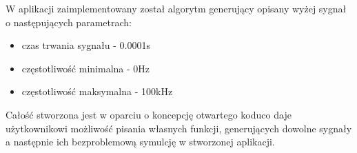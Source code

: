 W aplikacji zaimplementowany został algorytm generujący opisany wyżej sygnał o następujących parametrach:

\begin{itemize}
\item czas trwania sygnału - 0.0001s
\item częstotliwość minimalna - 0Hz
\item częstotliwość maksymalna - 100kHz
\end{itemize}

Całość stworzona jest w oparciu o koncepcję otwartego koduco daje użytkownikowi możliwość pisania własnych funkcji, generujących dowolne sygnały a następnie ich bezproblemową symulcję w stworzonej aplikacji.
